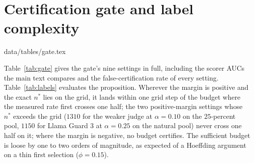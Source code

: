 \documentclass{article} %
\makeatletter
\newcommand{\tabinput}[1]{\@@input#1 }
\makeatother
\begin{document}
\section{Certification gate and label complexity}
\label{app:labels}
\begin{table}[h]
\centering\small
\caption{Certification gate on BeaverTails pools of $4000$ pairs: $n = 200$, $\delta = 0.1$, $200$ calibration draws per setting, for the two judges and Llama Guard 3.}
\label{tab:gate}
\tabinput{data/tables/gate.tex}
\end{table}
\begin{table}[h]
\centering\small
\caption{Proposition~\ref{prop:labels} on the pools of Figure~\ref{fig:labels}: the exact smallest budget reaching certification rate $0.5$, the sufficient budget of Corollary~\ref{cor:budget}, and the first budget on the measured grid $\{50, 100, 200, 300, 400, 600, 800\}$ whose rate reaches $0.5$.}
\label{tab:labels}
\resizebox{\linewidth}{!}{\tabinput{data/tables/label_bound.tex}}
\end{table}
Table~\ref{tab:gate} gives the gate's nine settings in full, including the scorer AUCs the main text compares and the false-certification rate of every setting. Table~\ref{tab:labels} evaluates the proposition. Wherever the margin is positive and the exact $n^{*}$ lies on the grid, it lands within one grid step of the budget where the measured rate first crosses one half; the two positive-margin settings whose $n^{*}$ exceeds the grid ($1310$ for the weaker judge at $\alpha = 0.10$ on the $25$-percent pool, $1150$ for Llama Guard 3 at $\alpha = 0.25$ on the natural pool) never cross one half on it; where the margin is negative, no budget certifies. The sufficient budget is loose by one to two orders of magnitude, as expected of a Hoeffding argument on a thin first selection ($\phi = 0.15$).
\end{document}
